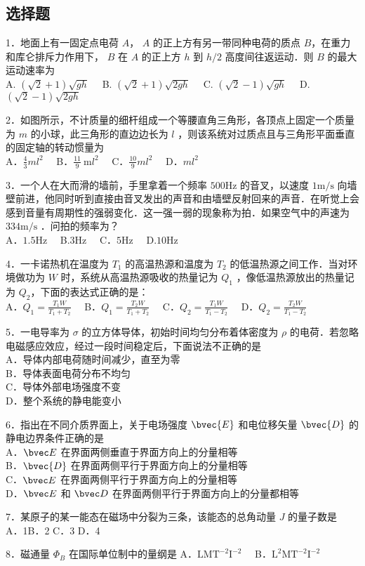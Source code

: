 
\subsection{选择题}
1．地面上有一固定点电荷 $A$， $A$ 的正上方有另一带同种电荷的质点 $B$，在重力和库仑排斥力作用下， $B$ 在 $A$ 的正上方 $h$ 到 $h/2$ 高度间往返运动．则 $B$ 的最大运动速率为\\
A. $(\sqrt{2}+1) \sqrt{g h}\quad$
B. $(\sqrt{2}+1) \sqrt{2 g h}\quad$
C. $(\sqrt{2}-1) \sqrt{g h}\quad$
D. $(\sqrt{2}-1) \sqrt{2 g h}$

2．如图所示，不计质量的细杆组成一个等腰直角三角形，各顶点上固定一个质量为 $m$ 的小球，此三角形的直边边长为 $l$ ，则该系统对过质点且与三角形平面垂直的固定轴的转动惯量为\\
A．$\frac{4}{3} m l^{2}\quad$
B．$\frac{11}{9} \mathrm{~m} l^{2}\quad$
C．$\frac{10}{9} m l^{2}\quad$
D．$ml^{2}$

3．一个人在大而滑的墙前，手里拿着一个频率 $500\mathrm{Hz}$ 的音叉，以速度 $1\mathrm{m/s}$ 向墙壁前进，他同时听到直接由音叉发出的声音和由墙壁反射回来的声音．在听觉上会感到音量有周期性的强弱变化．这一强一弱的现象称为拍．如果空气中的声速为 $334\mathrm{m/s}$ ．问拍的频率为？\\
A．$1.5\mathrm{Hz}\quad$ B.$3\mathrm{Hz}\quad$ C．$5\mathrm{Hz}\quad$ D.$10\mathrm{Hz}$

4．一卡诺热机在温度为 $T_1$ 的高温热源和温度为 $T_2$ 的低温热源之间工作．当对环境做功为 $W$ 时，系统从高温热源吸收的热量记为 $Q_1$ ，像低温热源放出的热量记为 $Q_2$，下面的表达式正确的是：\\

A．$Q_1=\frac{T_1W}{T_1+T_2}\quad$ B．$Q_1=\frac{T_2W}{T_1+T_2}\quad$ C．$Q_2=\frac{T_1W}{T_1-T_2}\quad$ D．$Q_2=\frac{T_2W}{T_1-T_2}$

5．一电导率为 $\sigma$ 的立方体导体，初始时间均匀分布着体密度为 $\rho$ 的电荷．若忽略电磁感应效应，经过一段时间稳定后，下面说法不正确的是\\
A．导体内部电荷随时间减少，直至为零\\
B．导体表面电荷分布不均匀\\
C．导体外部电场强度不变\\
D．整个系统的静电能变小

6．指出在不同介质界面上，关于电场强度 $\bvec{E}$ 和电位移矢量 $\bvec{D}$ 的静电边界条件正确的是\\
A．$\bvec E$ 在界面两侧垂直于界面方向上的分量相等\\
B．$\bvec{D}$ 在界面两侧平行于界面方向上的分量相等\\
C．$\bvec E$ 在界面两侧平行于界面方向上的分量相等\\
D．$\bvec E$ 和 $\bvec D$ 在界面两侧平行于界面方向上的分量都相等

7．某原子的某一能态在磁场中分裂为三条，该能态的总角动量 $J$ 的量子数是\\
A．1\quad B．2 \quad C．3 \quad D．4

8．磁通量 $\Phi_B$ 在国际单位制中的量纲是
A．$\mathrm{LMT^{-2}I^{-2}}\quad$ B．$\mathrm{L^{2}MT^{-2}I^{-2}}$